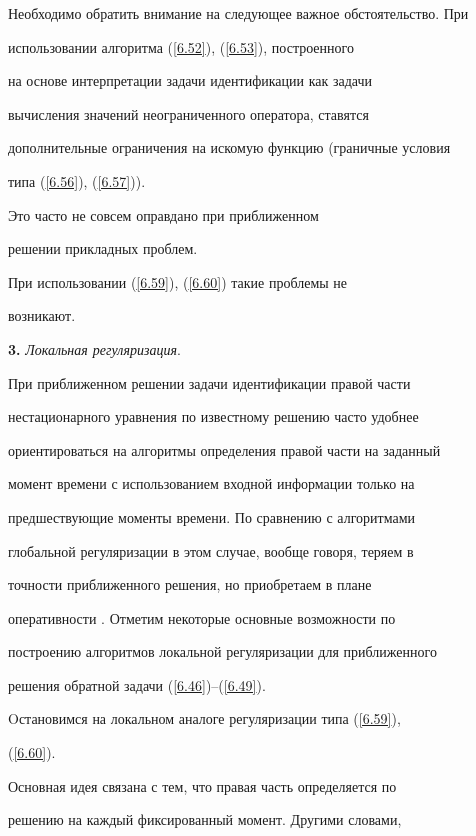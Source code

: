 Необходимо обратить внимание на следующее важное обстоятельство. При


использовании алгоритма (\ref{6.52}), (\ref{6.53}), построенного


на основе  интерпретации задачи идентификации как задачи


вычисления значений неограниченного оператора, ставятся


дополнительные ограничения на искомую функцию (граничные условия


типа (\ref{6.56}), (\ref{6.57})). 


Это часто не совсем оправдано при приближенном


решении прикладных проблем.


При использовании (\ref{6.59}), (\ref{6.60}) такие проблемы не


возникают.


\medskip





{\bf 3.} {\it Локальная регуляризация}.


При приближенном решении задачи идентификации правой части


нестационарного уравнения по известному решению часто удобнее


ориентироваться на алгоритмы  определения правой части на заданный


момент времени с использованием входной информации только на


предшествующие моменты времени. По сравнению с алгоритмами


глобальной регуляризации в этом случае, вообще говоря, теряем в


точности приближенного решения, но приобретаем в плане


оперативности \cite{g2}. Отметим некоторые основные возможности по


построению алгоритмов локальной регуляризации для приближенного


решения обратной задачи (\ref{6.46})--(\ref{6.49}). 


Oстановимся на локальном аналоге регуляризации типа (\ref{6.59}),


(\ref{6.60}).





Основная идея связана с тем, что правая часть определяется по


решению на каждый фиксированный момент. Другими словами,


